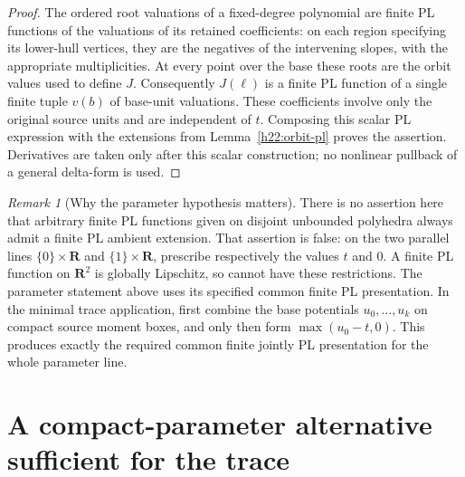 \documentclass[11pt,a4paper]{article}
\theoremstyle{definition}
\theoremstyle{remark}
\newtheorem{remark}[theorem]{Remark}
\newcommand{\R}{\mathbf R}
\begin{document}
\begin{proof}
The ordered root valuations of a fixed-degree polynomial are finite
PL functions of the valuations of its retained coefficients: on each
region specifying its lower-hull vertices, they are the negatives of
the intervening slopes, with the appropriate multiplicities. At every
point over the base these roots are the orbit values used to define
$J$. Consequently $J(\ell)$ is a finite PL function of a single finite
tuple $v(b)$ of base-unit valuations. These coefficients involve only
the original source units and are independent of $t$. Composing this
scalar PL expression with the extensions from
Lemma~\ref{h22:orbit-pl} proves the assertion. Derivatives are taken
only after this scalar construction; no nonlinear pullback of a
general delta-form is used.
\end{proof}

\begin{remark}[Why the parameter hypothesis matters]
There is no assertion here that arbitrary finite PL functions given
on disjoint unbounded polyhedra always admit a finite PL ambient
extension. That assertion is false: on the two parallel lines
$\{0\}\times\R$ and $\{1\}\times\R$, prescribe respectively the
values $t$ and $0$. A finite PL function on $\R^2$ is globally
Lipschitz, so cannot have these restrictions. The parameter statement
above uses its specified common finite PL presentation. In the minimal
trace application, first combine the base potentials $u_0,\ldots,u_k$
on compact source moment boxes, and only then form
$\max(u_0-t,0)$. This produces exactly the required common finite
jointly PL presentation for the whole parameter line.
\end{remark}

\section{A compact-parameter alternative sufficient for the trace}
\end{document}
